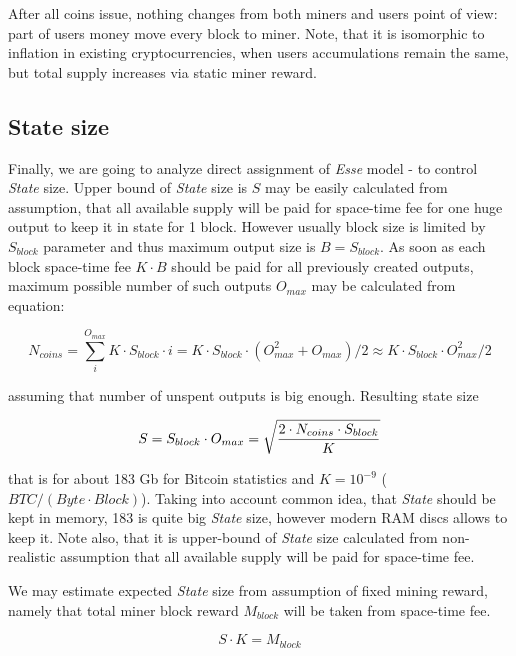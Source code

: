 \documentclass[]{article}   %
\newcommand{\esse}{\textit{Esse}}
\newcommand{\state}{\textit{State}}
\begin{document}
After all coins issue, nothing changes from both miners and users point of view: part of users money move every block to miner. Note, that it is isomorphic to inflation in existing cryptocurrencies, when users accumulations remain the same, but total supply increases via static miner reward.

\subsection{State size}

Finally, we are going to analyze direct assignment of \esse{} model - to control \state{} size. Upper bound of \state{} size is $S$ may be easily calculated from assumption, that all available supply will be paid for space-time fee for one huge output to keep it in state for 1 block. However usually block size is limited by $S_{block}$ parameter and thus maximum output size is $B = S_{block}$. As soon as each block space-time fee $K \cdot B$ should be paid for all previously created outputs, maximum possible number of such outputs $O_{max}$ may be calculated from equation:

\begin{equation}
N_{coins} = \sum_i^{O_{max}}{K \cdot S_{block} \cdot i} = K \cdot S_{block} \cdot ( O_{max}^2 + O_{max}) / 2 \approx K \cdot S_{block} \cdot O_{max}^2 / 2
\end{equation}

assuming that number of unspent outputs is big enough. Resulting state size

\begin{equation}
\label{eq:statesizemax}
S = S_{block} \cdot O_{max} = \sqrt { 2 \cdot N_{coins} \cdot S_{block} \over K}
\end{equation}

that is for about 183 Gb for Bitcoin statistics and $K=10^{-9}$ ($BTC / (Byte \cdot Block)$). Taking into account common idea, that \state{} should be kept in memory, 183 is quite big \state{} size, however modern RAM discs allows to keep it. Note also, that it is upper-bound of \state{} size calculated from non-realistic assumption that all available supply will be paid for space-time fee.

We may estimate expected \state{} size from assumption of fixed mining reward, namely that total miner block reward $M_{block}$ will be taken from space-time fee.

\begin{equation}
\label{eq:statesizeexp}
S \cdot K = M_{block}
\end{equation}
\end{document}
